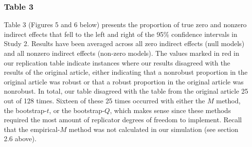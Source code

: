 \documentclass[10,a4paperpaper,]{article}
\begin{document}
\newpage

\subsubsection{Table 3}

Table 3 (Figures 5 and 6 below) presents the proportion of true zero and
nonzero indirect effects that fell to the left and right of the 95\%
confidence intervals in Study 2. Results have been averaged across all
zero indirect effects (null models) and all nonzero indirect effects
(non-zero models). The values marked in red in our replication table
indicate instances where our results disagreed with the results of the
original article, either indicating that a nonrobust proportion in the
original article was robust or that a robust proportion in the original
article was nonrobust. In total, our table disagreed with the table from
the original article 25 out of 128 times. Sixteen of these 25 times
occurred with either the \(M\) method, the bootstrap-\(t\), or the
bootstrap-\(Q\), which makes sense since these methods required the most
amount of replicator degrees of freedom to implement. Recall that the
empirical-\(M\) method was not calculated in our simulation (see section
2.6 above).
\end{document}
